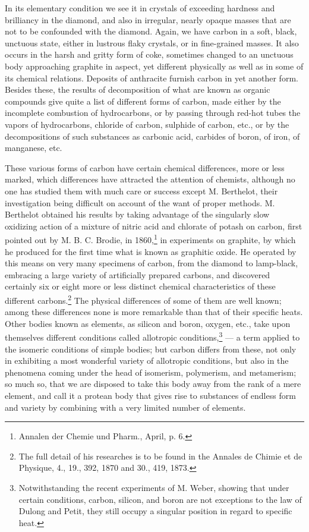 \documentclass[a4paper, 11pt, oneside, english]{article}
\begin{document}
In its elementary condition we see it in crystals of exceeding hardness and brilliancy in the diamond, and also in irregular, nearly opaque masses that are not to be confounded with the diamond. Again, we have carbon in a soft, black, unctuous state, either in lustrous flaky crystals, or in fine-grained masses. It also occurs in the harsh and gritty form of coke, sometimes changed to an unctuous body approaching graphite in aspect, yet different physically as well as in some of its chemical relations. Deposits of anthracite furnish carbon in yet another form. Besides these, the results of decomposition of what are known as organic compounds give quite a list of different forms of carbon, made either by the incomplete combustion of hydrocarbons, or by passing through red-hot tubes the vapors of hydrocarbons, chloride of carbon, sulphide of carbon, etc., or by the decompositions of such substances as carbonic acid, carbides of boron, of iron, of manganese, etc.

These various forms of carbon have certain chemical differences, more or less marked, which differences have attracted the attention of chemists, although no one has studied them with much care or success except M. Berthelot, their investigation being difficult on account of the want of proper methods. M. Berthelot obtained his results by taking advantage of the singularly slow oxidizing action of a mixture of nitric acid and chlorate of potash on carbon, first pointed out by M. B. C. Brodie, in 1860,\footnote{Annalen der Chemie und Pharm., April, p. 6.} in experiments on graphite, by which he produced for the first time what is known as graphitic oxide. He operated by this means on very many specimens of carbon, from the diamond to lamp-black, embracing a large variety of artificially prepared carbons, and discovered certainly six or eight more or less distinct chemical characteristics of these different carbons.\footnote{The full detail of his researches is to be found in the Annales de Chimie et de Physique, 4., 19., 392, 1870 and 30., 419, 1873.} The physical differences of some of them are well known; among these differences none is more remarkable than that of their specific heats. Other bodies known as elements, as silicon and boron, oxygen, etc., take upon themselves different conditions called allotropic conditions,\footnote{Notwithstanding the recent experiments of M. Weber, showing that under certain conditions, carbon, silicon, and boron are not exceptions to the law of Dulong and Petit, they still occupy a singular position in regard to specific heat.} --- a term applied to the isomeric conditions of simple bodies; but carbon differs from these, not only in exhibiting a most wonderful variety of allotropic conditions, but also in the phenomena coming under the head of isomerism, polymerism, and metamerism; so much so, that we are disposed to take this body away from the rank of a mere element, and call it a protean body that gives rise to substances of endless form and variety by combining with a very limited number of elements.
\end{document}
